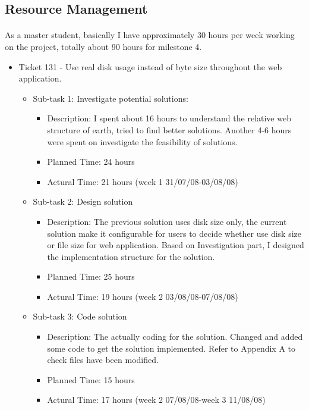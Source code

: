 \documentclass[oneside, 10pt, a4]{article}
\begin{document}
\subsection*{Resource Management}

\paragraph{}
As a master student, basically I have approximately 30 hours per week working on the project, totally about 90 hours for milestone 4.
\begin{itemize}
 \item Ticket 131 - Use real disk usage instead of byte size throughout the web application.
	\begin{itemize}
	\item Sub-task 1: Investigate potential solutions:
			\begin{itemize}
			\item Description: I spent about 16 hours to understand the relative web structure of earth, tried to find better solutions. Another 4-6 hours were spent on investigate the feasibility of solutions.
			\item Planned Time: 24 hours
			\item Actural Time: 21 hours (week 1 31/07/08-03/08/08)
			\end{itemize}
		\item Sub-task 2: Design solution
			\begin{itemize}
			\item Description: The previous solution uses disk size only, the current solution make it configurable for users to decide whether use disk size or file size for web application. Based on Investigation part, I designed the implementation structure for the solution.
			\item Planned Time: 25 hours
			\item Actural Time: 19 hours (week 2 03/08/08-07/08/08)
			\end{itemize}
		\item Sub-task 3: Code solution
			\begin{itemize}
			\item Description: The actually coding for the solution. Changed and added some code to get the solution implemented. Refer to Appendix A to check files have been modified.
			\item Planned Time: 15 hours
			\item Actural Time: 17 hours (week 2 07/08/08-week 3 11/08/08)

\end{itemize}
\end{itemize}
\end{itemize}
\end{document}
